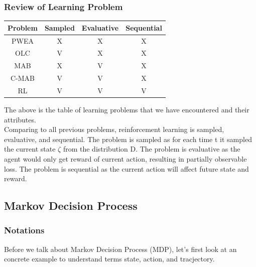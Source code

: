 \documentclass[11pt]{article}
\begin{document}
\subsubsection*{Review of Learning Problem}
\begin{center}
 \begin{tabular}{|c| c |c |c|} 
 \hline
 Problem & Sampled & Evaluative & Sequential \\ [0.5ex] 
 \hline
 PWEA & X & X & X \\ 
 \hline
 OLC & V & X & X \\
 \hline
 MAB & X & V & X \\
 \hline
 C-MAB & V & V & X \\
 \hline
 RL & V & V & V \\  
 \hline
\end{tabular}
\end{center}
The above is the table of learning problems that we have encountered and their attributes. \\
Comparing to all previous problems, reinforcement learning is sampled, evaluative, and sequential. The problem is sampled as for each time t it sampled the current state $\zeta$ from the distribution D. The problem is evaluative as the agent would only get reward of current action, resulting in partially observable loss. The problem is sequential as the current action will affect future state and reward. 
\subsection{Markov Decision Process}
\subsubsection{Notations}
Before we talk about Markov Decision Process (MDP)\cite{bellman1957markovian}, let's first look at an concrete example to understand terms state, action, and tracjectory.
\end{document}
